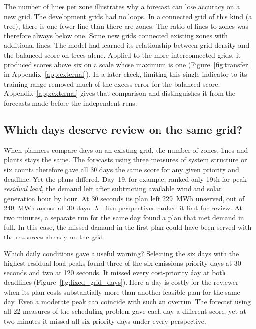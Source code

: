 \documentclass[11pt,a4paper]{article}
\begin{document}
The number of lines per zone illustrates why a forecast can lose accuracy on a new grid. The development grids had no loops. In a connected grid of this kind (a tree), there is one fewer line than there are zones. The ratio of lines to zones was therefore always below one. Some new grids connected existing zones with additional lines. The model had learned its relationship between grid density and the balanced score on trees alone. Applied to the more interconnected grids, it produced scores above six on a scale whose maximum is one (Figure~\ref{fig:transfer} in Appendix~\ref{app:external}). In a later check, limiting this single indicator to its training range removed much of the excess error for the balanced score. Appendix~\ref{app:external} gives that comparison and distinguishes it from the forecasts made before the independent runs.



\subsection{Which days deserve review on the same grid?}
\label{sec:fixeddays}

When planners compare days on an existing grid, the number of zones, lines and plants stays the same. The forecasts using three measures of system structure or six counts therefore gave all 30 days the same score for any given priority and deadline. Yet the plans differed. Day~19, for example, ranked only 19th for peak \emph{residual load}, the demand left after subtracting available wind and solar generation hour by hour. At 30 seconds its plan left 229~MWh unserved, out of 249~MWh across all 30 days. All five perspectives ranked it first for review. At two minutes, a separate run for the same day found a plan that met demand in full. In this case, the missed demand in the first plan could have been served with the resources already on the grid.

Which daily conditions gave a useful warning? Selecting the six days with the highest residual load peaks found three of the six emissions-priority days at 30 seconds and two at 120 seconds. It missed every cost-priority day at both deadlines (Figure~\ref{fig:fixed_grid_days}). Here a day is costly for the reviewer when its plan costs substantially more than another feasible plan for the same day. Even a moderate peak can coincide with such an overrun. The forecast using all 22 measures of the scheduling problem gave each day a different score, yet at two minutes it missed all six priority days under every perspective.
\end{document}
